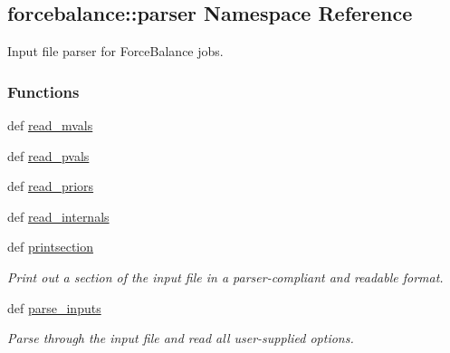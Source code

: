 \hypertarget{namespaceforcebalance_1_1parser}{\subsection{forcebalance\-:\-:parser \-Namespace \-Reference}
\label{namespaceforcebalance_1_1parser}
}


\-Input file parser for \-Force\-Balance jobs.  


\subsubsection*{\-Functions}
\begin{DoxyCompactItemize}
\item 
def \hyperlink{namespaceforcebalance_1_1parser_aef8b51dba6bb9767a9a956319eb3cc08}{read\-\_\-mvals}
\item 
def \hyperlink{namespaceforcebalance_1_1parser_a56fb1e139dad24bac29f25a3870765ca}{read\-\_\-pvals}
\item 
def \hyperlink{namespaceforcebalance_1_1parser_a94c3f1acd06b640db3042dc45e32af8e}{read\-\_\-priors}
\item 
def \hyperlink{namespaceforcebalance_1_1parser_a10827b0b21d0463bc9e786f161a02654}{read\-\_\-internals}
\item 
def \hyperlink{namespaceforcebalance_1_1parser_a00a8cb7b534312c13b11d4bb39bb3959}{printsection}
\begin{DoxyCompactList}\small\item\em \-Print out a section of the input file in a parser-\/compliant and readable format. \end{DoxyCompactList}\item 
def \hyperlink{namespaceforcebalance_1_1parser_ac184c809737a27f35530020322431f7c}{parse\-\_\-inputs}
\begin{DoxyCompactList}\small\item\em \-Parse through the input file and read all user-\/supplied options. \end{DoxyCompactList}\end{DoxyCompactItemize}
